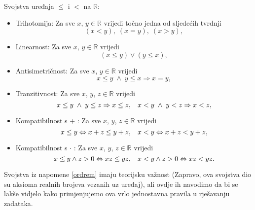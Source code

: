\begin{remark}
\label{ordrem}
Svojstva uređaja $\leq$ i $<$ na $\mathbb{R}$:
\begin{itemize}
\item Trihotomija: Za sve $x$, $y\in \mathbb{R}$ vrijedi točno jedna od sljedećih tvrdnji
$$(x<y),\; (x=y),\; (x>y),$$
\item Linearnost: Za sve $x$, $y\in \mathbb{R}$ vrijedi
$$(x\leq y) \vee (y\leq x),$$
\item Antisimetričnost: Za sve $x$, $y\in \mathbb{R}$ vrijedi
$$x\leq y\; \wedge\; y\leq x\Rightarrow x=y,$$
\item Tranzitivnost: Za sve $x$, $y$, $z\in \mathbb{R}$ vrijedi
$$x\leq y\; \wedge\; y\leq z\Rightarrow x\leq z,\hspace{0.3cm}x< y\; \wedge\; y< z\Rightarrow x< z,$$
\item Kompatibilnost s $+$ : Za sve $x$, $y$, $z\in \mathbb{R}$ vrijedi
$$x\leq y\Leftrightarrow x+z\leq y+z,\hspace{0.3cm}x< y\Leftrightarrow x+z< y+z,$$
\item Kompatibilnost s $\cdot$ : Za sve $x$, $y$, $z\in \mathbb{R}$ vrijedi
$$x\leq y\wedge z>0\Leftrightarrow xz\leq yz,\hspace{0.3cm}x< y\wedge z>0\Leftrightarrow xz< yz.$$
\end{itemize}
\end{remark}

Svojstva iz napomene \ref{ordrem} imaju teorijsku važnost (Zapravo, ova svojstva dio su aksioma realnih brojeva vezanih uz uređaj), ali ovdje ih navodimo da bi se lakše vidjelo kako primjenjujemo ova vrlo jednostavna pravila u rješavanju zadataka.

